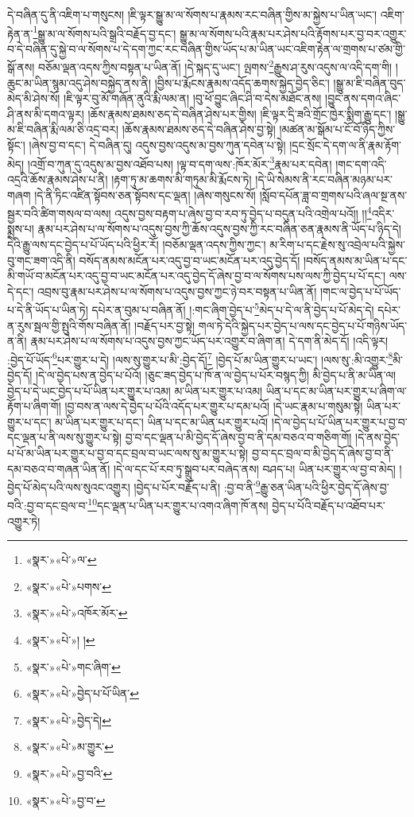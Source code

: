 དེ་བཞིན་དུ་ནི་འཇིག་པ་གསུངས། །ཇི་ལྟར་སྒྱུ་མ་ལ་སོགས་པ་རྣམས་རང་བཞིན་གྱིས་མ་སྐྱེས་པ་ཡིན་ཡང་། འཇིག་རྟེན་ན་\footnote{«སྣར་»«པེ་»ལ་}སྒྱུ་མ་ལ་སོགས་པའི་སྒྲའི་བརྗོད་བྱ་དང་། སྒྱུ་མ་ལ་སོགས་པའི་རྣམ་པར་ཤེས་པའི་རྟོགས་པར་བྱ་བར་འགྱུར་བ་དེ་བཞིན་དུ་སྐྱེ་བ་ལ་སོགས་པ་དེ་དག་ཀྱང་རང་བཞིན་གྱིས་ཡོད་པ་མ་ཡིན་ཡང་འཇིག་རྟེན་ལ་གྲགས་པ་ཙམ་གྱི་སྒོ་ནས། བཅོམ་ལྡན་འདས་ཀྱིས་བསྟན་པ་ཡིན་ནོ། །དེ་སྐད་དུ་ཡང་། ལྤགས་\footnote{«སྣར་»«པེ་»པགས་}རྒྱུས་ཤ་རུས་འདུས་ལ་འདི་དག་གི། །ཆུང་མ་ཡིན་སྙམ་འདུ་ཤེས་བསྐྱེད་ནས་ནི། །བྱིས་པ་རྨོངས་རྣམས་འདོད་ཆགས་སྐྱེད་བྱེད་ཅིང་། །སྒྱུ་མ་ཇི་བཞིན་བུད་མེད་མི་ཤེས་སོ། །ཇི་ལྟར་བུ་མོ་གཞོན་ནུའི་རྨི་ལམ་ན། །བུ་ཕོ་བྱུང་ཞིང་ཤི་བ་དེས་མཐོང་ནས། །བྱུང་ནས་དགའ་ཞིང་ཤི་ནས་མི་དགའ་ལྟར། །ཆོས་རྣམས་ཐམས་ཅད་དེ་བཞིན་ཤེས་པར་གྱིས། །ཇི་ལྟར་དྲི་ཟའི་གྲོང་ཁྱེར་སྨིག་རྒྱུ་དང་། །སྒྱུ་མ་ཇི་བཞིན་རྨི་ལམ་ཅི་འདྲ་བར། །ཆོས་རྣམས་ཐམས་ཅད་དེ་བཞིན་ཤེས་བྱ་སྟེ། །མཚན་མ་སྒོམ་པ་ངོ་བོ་ཉིད་ཀྱིས་སྟོང་། །ཞེས་བྱ་བ་དང་། དེ་བཞིན་དུ། འདུས་བྱས་འདུས་མ་བྱས་ཀུན་དབེན་པ་སྟེ། །དྲང་སྲོང་དེ་དག་ལ་ནི་རྣམ་རྟོག་མེད། །འགྲོ་བ་ཀུན་དུ་འདུས་མ་བྱས་འཐོབ་པས། །ལྟ་བ་དག་ལས་:ཁོར་མོར་\footnote{«སྣར་»«པེ་»འཁོར་མོར་}རྣམ་པར་དབེན། །གང་དག་འདི་འདྲའི་ཆོས་རྣམས་ཤེས་པ་ནི། །རྟག་ཏུ་མ་ཆགས་མི་གཏུམ་མི་རྨོངས་ཏེ། །དེ་ཡི་སེམས་ནི་རང་བཞིན་མཉམ་པར་གཞག །དེ་ནི་ཏིང་འཛིན་སྟོབས་ཅན་སྟོབས་དང་ལྡན། །ཞེས་གསུངས་སོ། །སློབ་དཔོན་ཟླ་བ་གྲགས་པའི་ཞལ་སྔ་ནས་སྦྱར་བའི་ཚིག་གསལ་བ་ལས། འདུས་བྱས་བརྟག་པ་ཞེས་བྱ་བ་རབ་ཏུ་བྱེད་པ་བདུན་པའི་འགྲེལ་པའོ།། །།\footnote{«སྣར་»«པེ་»། །}འདིར་སྨྲས་པ། རྣམ་པར་ཤེས་པ་ལ་སོགས་པ་འདུས་བྱས་ཀྱི་ཆོས་འདུས་བྱས་ཀྱི་རང་བཞིན་ཅན་རྣམས་ནི་ཡོད་པ་ཉིད་དེ། དེའི་རྒྱུ་ལས་དང་བྱེད་པ་པོ་ཡོད་པའི་ཕྱིར་རོ། །བཅོམ་ལྡན་འདས་ཀྱིས་ཀྱང་། མ་རིག་པ་དང་རྗེས་སུ་འབྲེལ་པའི་སྐྱེས་བུ་གང་ཟག་འདི་ནི། བསོད་ནམས་མངོན་པར་འདུ་བྱ་བ་ཡང་མངོན་པར་འདུ་བྱེད་དོ། །བསོད་ནམས་མ་ཡིན་པ་དང་མི་གཡོ་བ་མངོན་པར་འདུ་བྱ་བ་ཡང་མངོན་པར་འདུ་བྱེད་དོ་ཞེས་བྱ་བ་ལ་སོགས་པས་ལས་ཀྱི་བྱེད་པ་པོ་དང་། ལས་དེ་དང་། འབྲས་བུ་རྣམ་པར་ཤེས་པ་ལ་སོགས་པ་འདུས་བྱས་ཀྱང་ཉེ་བར་བསྟན་པ་ཡིན་ནོ། །གང་ལ་བྱེད་པ་པོ་ཡོད་པ་དེ་ནི་ཡོད་པ་ཡིན་ཏེ། དཔེར་ན་བུམ་པ་བཞིན་ནོ། །:གང་ཞིག་བྱེད་པ་\footnote{«སྣར་»«པེ་»གང་ཞིག་}མེད་པ་དེ་ལ་ནི་བྱེད་པ་པོ་མེད་དེ། དཔེར་ན་རུས་སྦལ་གྱི་སྤུའི་གོས་བཞིན་ནོ། །བརྗོད་པར་བྱ་སྟེ། གལ་ཏེ་དེའི་སྐྱེད་པར་བྱེད་པ་ལས་དང་བྱེད་པ་པོ་གཉིས་ཡོད་ན་ནི། རྣམ་པར་ཤེས་པ་ལ་སོགས་པ་འདུས་བྱས་ཀྱང་ཡོད་པར་འགྱུར་བ་ཞིག་ན། དེ་དག་ནི་མེད་དོ། །འདི་ལྟར། :བྱེད་པོ་ཡོད་\footnote{«སྣར་»«པེ་»བྱེད་པ་པོ་ཡིན་}པར་གྱུར་པ་དེ། །ལས་སུ་གྱུར་པ་མི་:བྱེད་དོ།\footnote{«སྣར་»«པེ་»བྱེད་དེ།} །བྱེད་པོ་མ་ཡིན་གྱུར་པ་ཡང་། །ལས་སུ་:མི་འགྱུར་\footnote{«སྣར་»«པེ་»མ་གྱུར་}མི་བྱེད་དོ། །དེ་ལ་བྱེད་པས་ན་བྱེད་པ་པོའོ། །ཅུང་ཟད་བྱེད་པ་ཁོ་ན་ལ་བྱེད་པ་པོར་བསྙད་ཀྱི། མི་བྱེད་པ་ནི་མ་ཡིན་ལ། བྱེད་པ་དེ་ཡང་བྱེད་པ་པོ་ཡིན་པར་གྱུར་པ་འམ། མ་ཡིན་པར་གྱུར་པ་འམ། ཡིན་པ་དང་མ་ཡིན་པར་གྱུར་པ་ཞིག་ལ་རྟོག་པ་ཞིག་གོ། །བྱ་བས་ན་ལས་དེ་བྱེད་པ་པོའི་འདོད་པར་གྱུར་པ་དམ་པའོ། །དེ་ཡང་རྣམ་པ་གསུམ་སྟེ། ཡིན་པར་གྱུར་པ་དང་། མ་ཡིན་པར་གྱུར་པ་དང་། ཡིན་པ་དང་མ་ཡིན་པར་གྱུར་པའོ། །དེ་ལ་བྱེད་པ་པོ་ཡིན་པར་གྱུར་པ་བྱ་བ་དང་ལྡན་པ་ནི་ལས་སུ་གྱུར་པ་སྟེ། བྱ་བ་དང་ལྡན་པ་མི་བྱེད་དོ་ཞེས་བྱ་བ་ནི་དམ་བཅའ་བ་གཅིག་གོ། །དེ་ནས་བྱེད་པ་པོ་མ་ཡིན་པར་གྱུར་པ་བྱ་བ་དང་བྲལ་བ་ཡང་ལས་སུ་མ་གྱུར་པ་སྟེ། བྱ་བ་དང་བྲལ་བ་མི་བྱེད་དོ་ཞེས་བྱ་བ་ནི་དམ་བཅའ་བ་གཞན་ཡིན་ནོ། །དེ་ལ་དང་པོ་རབ་ཏུ་སྒྲུབ་པར་བཞེད་ནས། བཤད་པ། ཡིན་པར་གྱུར་ལ་བྱ་བ་མེད། །བྱེད་པོ་མེད་པའི་ལས་སུའང་འགྱུར། །བྱེད་པ་པོར་བརྗོད་པ་ནི། :བྱ་བ་ནི་\footnote{«སྣར་»«པེ་»བྱ་བའི་}རྒྱུ་ཅན་ཡིན་པའི་ཕྱིར་བྱེད་དོ་ཞེས་བྱ་བའི་:བྱ་བ་དང་བྲལ་བ་\footnote{«སྣར་»«པེ་»བྱ་བ་}དང་ལྡན་པ་ཡིན་པར་གྱུར་པ་འགའ་ཞིག་ཁོ་ནས། བྱེད་པ་པོའི་བརྗོད་པ་འཐོབ་པར་འགྱུར་ཏེ། 